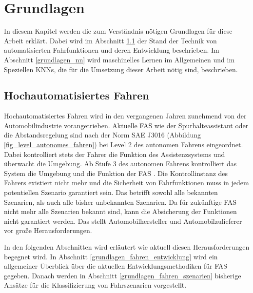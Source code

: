 
\chapter{Grundlagen}
\label{grundlagen}

In diesem Kapitel werden die zum Verständnis nötigen Grundlagen für diese Arbeit erklärt. Dabei wird im Abschnitt \ref{grundlagen_fahren} der Stand der Technik von automatisierten Fahrfunktionen und deren Entwicklung beschrieben. Im Abschnitt \ref{grundlagen_nn} wird maschinelles Lernen im Allgemeinen und im Speziellen \acp{KNN}, die für die Umsetzung dieser Arbeit nötig sind, beschrieben.

\section{Hochautomatisiertes Fahren}
\label{grundlagen_fahren}

Hochautomatisiertes Fahren wird in den vergangenen Jahren zunehmend von der Automobilindustrie vorangetrieben. Aktuelle \ac{FAS} wie der Spurhalteassistant oder die Abstandsregelung sind nach der Norm SAE J3016 (Abbildung \ref{fig_level_autonomes_fahren}) bei Level 2 des autonomen Fahrens eingeordnet. Dabei kontrolliert stets der Fahrer die Funktion des Assistenzsystems und überwacht die Umgebung. Ab Stufe 3 des autonomen Fahrens kontrolliert das System die Umgebung und die Funktion der \ac{FAS} \cite{sae2014taxonomy}. Die Kontrollinstanz des Fahrers existiert nicht mehr und die Sicherheit von Fahrfunktionen muss in jedem potentiellen Szenario garantiert sein. Das betrifft sowohl alle bekannten Szenarien, als auch alle bisher unbekannten Szenarien. Da für zukünftige \ac{FAS} nicht mehr alle Szenarien bekannt sind, kann die Absicherung der Funktionen nicht garantiert werden. Das stellt Automobilhersteller und Automobilzulieferer vor große Herausforderungen. 


In den folgenden Abschnitten wird erläutert wie aktuell diesen Herausforderungen begegnet wird. In Abschnitt \ref{grundlagen_fahren_entwicklung} wird ein allgemeiner Überblick über die aktuellen Entwicklungsmethodiken für \ac{FAS} gegeben. Danach werden in Abschnitt \ref{grundlagen_fahren_szenarien} bisherige Ansätze für die Klassifizierung von Fahrszenarien vorgestellt.

